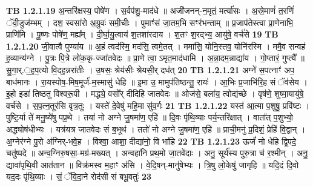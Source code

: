 \documentclass[17pt]{extarticle}
\begin{document}
                  \newline
                                \textbf{ TB 1.2.1.19} \newline
                  अ॒न्तरि॑क्षस्य॒ पोषे॑ण । स॒र्वप॑शु॒-माद॑धे ॥ अजी॑जनन्-न॒मृतं॒ मर्त्या॑सः । अ॒स्रे॒माणं॑ त॒रणिं॑ ॅवी॒डुज॑म्भम् । दश॒ स्वसा॑रो अ॒ग्रुवः॑ समी॒चीः । पुमाꣳ॑सं जा॒तम॒भि सꣳर॑भन्ताम् ॥ प्र॒जाप॑तेस्त्वा प्रा॒णेनाभि॒ प्राणि॑मि । पू॒ष्णः पोषे॑ण॒ मह्य᳚म् । दी॒र्घा॒यु॒त्वाय॑ श॒तशा॑रदाय । श॒तꣳ श॒रद्भ्य॒ आयु॑षे॒ वर्च॑से \textbf{ 19} \newline
                  \newline
                                \textbf{ TB 1.2.1.20} \newline
                  जी॒वात्वै पुण्या॑य ॥ अ॒हं त्वद॑स्मि॒ मद॑सि॒ त्वमे॒तत् । ममा॑सि॒ योनि॒स्तव॒ योनि॑रस्मि । ममै॒व सन्वह॑ ह॒व्यान्य॑ग्ने । पु॒त्रः पि॒त्रे लो॑क॒कृ-ज्जा॑तवेदः ॥ प्रा॒णे त्वा॒ ऽमृत॒माद॑धामि । अ॒न्ना॒दम॒न्नाद्या॑य । गो॒प्तारं॒ गुप्त्यै᳚ ॥ सु॒गा॒र्.॒ह॒प॒त्यो वि॒दह॒न्नरा॑तीः । उ॒षसः॒ श्रेय॑सीः श्रेयसी॒र् दध॑त् \textbf{ 20} \newline
                  \newline
                                \textbf{ TB 1.2.1.21} \newline
                  अग्ने॑ स॒पत्नाꣳ॑ अप॒ बाध॑मानः । रा॒यस्पोष॒-मिष॒मूर्ज॑-म॒स्मासु॑ धेहि ॥ इ॒मा उ॒ मामुप॑तिष्ठन्तु॒ रायः॑ । आ॒भिः प्र॒जाभि॑रि॒ह सं ॅव॑सेय । इ॒हो इडा॑ तिष्ठतु विश्वरू॒पी । मद्ध्ये॒ वसो᳚र् दीदिहि जातवेदः ॥ ओज॑से॒ बला॑य॒ त्वोद्य॑च्छे । वृष॑णे॒ शुष्मा॒यायु॑षे॒ वर्च॑से । स॒प॒त्न॒तूर॑सि वृत्र॒तूः । यस्ते॑ दे॒वेषु॑ महि॒मा सु॑व॒र्गः \textbf{ 21} \newline
                  \newline
                                \textbf{ TB 1.2.1.22} \newline
                  यस्त॑ आ॒त्मा प॒शुषु॒ प्रवि॑ष्टः । पुष्टि॒र्या ते॑ मनु॒ष्ये॑षु पप्र॒थे । तया॑ नो अग्ने जु॒षमा॑ण॒ एहि॑ ॥ दि॒वः पृ॑थि॒व्याः पर्य॒न्तरि॑क्षात् । वाता᳚त् प॒शुभ्यो॒ अद्ध्योष॑धीभ्यः । यत्र॑यत्र जातवेदः सं ब॒भूथ॑ । ततो॑ नो अग्ने जु॒षमा॑ण॒ एहि॑ ॥ प्राची॒मनु॑ प्र॒दिशं॒ प्रेहि॑ वि॒द्वान् । अ॒ग्नेर॑ग्ने पु॒रो अ॑ग्निर्-भवे॒ह । विश्वा॒ आशा॒ दीद्या॑नो॒ वि भा॑हि \textbf{ 22} \newline
                  \newline
                                \textbf{ TB 1.2.1.23} \newline
                  ऊर्जं॑ नो धेहि द्वि॒पदे॒ चतु॑ष्पदे ॥ अन्व॒ग्निरु॒षसा॒-मग्र॑-मख्यत् । अन्वहा॑नि प्रथ॒मो जा॒तवे॑दाः । अनु॒ सूर्य॑स्य पुरु॒त्रा च॑ र॒श्मीन् । अनु॒ द्यावा॑पृथि॒वी आत॑तान ॥ विक्र॑मस्व म॒हाꣳ अ॑सि । वे॒दि॒षन्-मानु॑षेभ्यः । त्रि॒षु लो॒केषु॑ जागृहि ॥ यदि॒दं दि॒वो यद॒दः पृ॑थि॒व्याः । सं॒ ॅवि॒दा॒ने रोद॑सी सं बभू॒वतुः॑ \textbf{ 23} \newline
\end{document}
